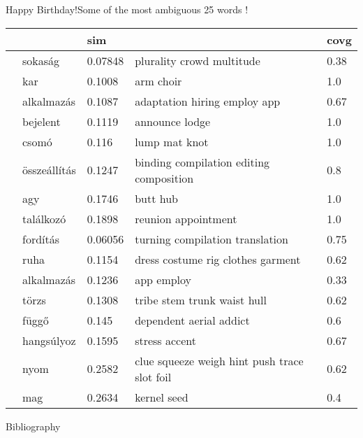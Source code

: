 \documentclass[10pt]{beamer}%
\newcommand{\adagram}{\texttt{AdaGram}}
\newcommand{\mutli}{\texttt{mutli}}
\begin{document}
\begin{frame}{Happy Birthday!}{Some of the most ambiguous 25 words}
        \resizebox{\textwidth} {!} {%
		\begin{tabular}{lllll}
			\toprule
			& & sim & & covg \\
			\midrule
			\multirow{8}{*}{\rotatebox[origin=c]{90}{\mutli~``context vs''}}
			&sokaság	& 0.07848	& plurality crowd multitude	& 0.38 \\
			&kar	& 0.1008	& arm choir	& 1.0 \\
			&alkalmazás	& 0.1087	& adaptation hiring employ app	& 0.67 \\
			&bejelent	& 0.1119	& announce lodge	& 1.0 \\
			&csomó	& 0.116	& lump mat knot	& 1.0 \\
			&összeállítás	& 0.1247	& binding compilation editing composition	& 0.8 \\
			&agy	& 0.1746	& butt hub	& 1.0 \\
			&találkozó	& 0.1898	& reunion appointment	& 1.0 \\
			\midrule
			\multirow{8}{*}{\rotatebox[origin=c]{90}{\adagram}}
			&fordítás	& 0.06056	& turning compilation translation	& 0.75 \\
			&ruha	& 0.1154	& dress costume rig clothes garment	& 0.62 \\
			&alkalmazás	& 0.1236	& app employ	& 0.33 \\
			&törzs	& 0.1308	& tribe stem trunk waist hull	& 0.62 \\
			&függő	& 0.145	& dependent aerial addict	& 0.6 \\
			&hangsúlyoz	& 0.1595	& stress accent	& 0.67 \\
			&nyom	& 0.2582	& clue squeeze weigh hint push trace slot foil	& 0.62 \\
			&mag	& 0.2634	& kernel seed	& 0.4 \\
			\bottomrule
		\end{tabular}
    }
\end{frame}

\begin{frame} [allowframebreaks] {Bibliography}
	\printbibliography
\end{frame}
\end{document}
